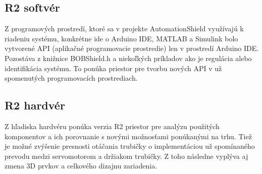 \subsection{R2 softvér}
\label{kap:1.3.1}
Z programových prostredí, ktoré sa v projekte AutomationShield využívajú k riadeniu systému, konkrétne ide o Arduino IDE, MATLAB a Simulink bolo vytvorené API (aplikačné programovacie prostredie) len v prostredí Arduino IDE. Pozostáva z knižnice BOBShield.h a niekoľkých príkladov ako je regulácia alebo identifikácia systému. To ponúka priestor pre tvorbu nových API v už spomenutých programovacích prostrediach. 


\subsection{R2 hardvér}
\label{kap:1.3.2}
Z hľadiska hardvéru ponúka verzia R2 priestor pre analýzu použitých komponentov a ich porovnanie s novými možnosťami ponúkanými na trhu. Tiež je možné zvýšenie presnosti otáčania trubičky o implementáciou už spomínaného prevodu medzi servomotorom a držiakom trubičky. Z toho následne vyplýva aj zmena 3D prvkov a celkového dizajnu zariadenia. 

